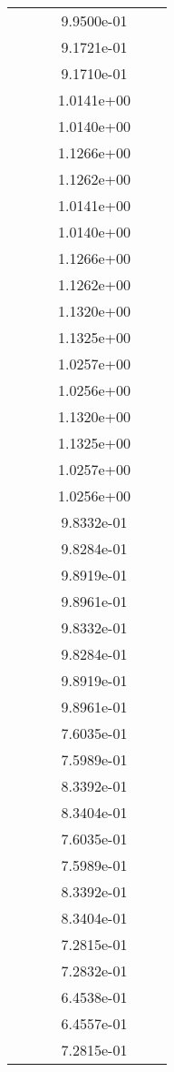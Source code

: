 \begin{xltabular}{\textwidth}{r|rS[table-format=1.3e+2]S[table-format=1.4e+2]S[table-format=1.4e+2]S[table-format=-1.5]}
&  &  & 9.9500e-01 & & \\
&  &  & 9.1721e-01 & & \\
&  &  & 9.1710e-01 & & \\
&  &  & 1.0141e+00 & & \\
&  &  & 1.0140e+00 & & \\
&  &  & 1.1266e+00 & & \\
&  &  & 1.1262e+00 & & \\
&  &  & 1.0141e+00 & & \\
&  &  & 1.0140e+00 & & \\
&  &  & 1.1266e+00 & & \\
&  &  & 1.1262e+00 & & \\
&  &  & 1.1320e+00 & & \\
&  &  & 1.1325e+00 & & \\
&  &  & 1.0257e+00 & & \\
&  &  & 1.0256e+00 & & \\
&  &  & 1.1320e+00 & & \\
&  &  & 1.1325e+00 & & \\
&  &  & 1.0257e+00 & & \\
&  &  & 1.0256e+00 & & \\
&  &  & 9.8332e-01 & & \\
&  &  & 9.8284e-01 & & \\
&  &  & 9.8919e-01 & & \\
&  &  & 9.8961e-01 & & \\
&  &  & 9.8332e-01 & & \\
&  &  & 9.8284e-01 & & \\
&  &  & 9.8919e-01 & & \\
&  &  & 9.8961e-01 & & \\
&  &  & 7.6035e-01 & & \\
&  &  & 7.5989e-01 & & \\
&  &  & 8.3392e-01 & & \\
&  &  & 8.3404e-01 & & \\
&  &  & 7.6035e-01 & & \\
&  &  & 7.5989e-01 & & \\
&  &  & 8.3392e-01 & & \\
&  &  & 8.3404e-01 & & \\
&  &  & 7.2815e-01 & & \\
&  &  & 7.2832e-01 & & \\
&  &  & 6.4538e-01 & & \\
&  &  & 6.4557e-01 & & \\
&  &  & 7.2815e-01 & & \\

\end{xltabular}
